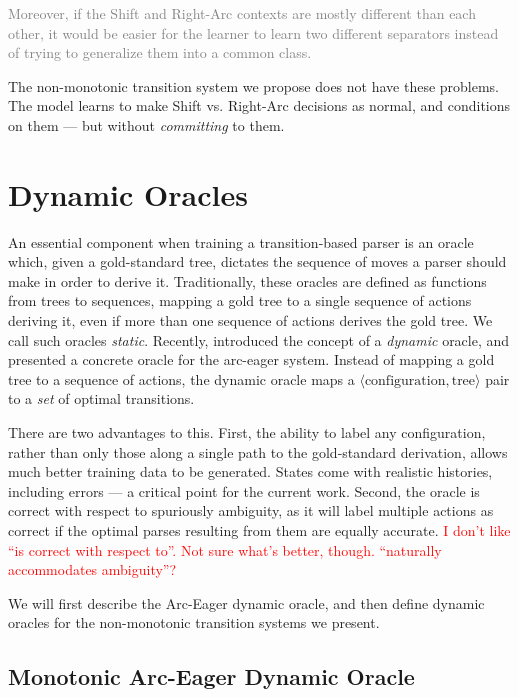 \documentclass[11pt,letterpaper]{article}
\newcommand{\tuple}[1]{$\langle#1\rangle$}
\newcommand{\maybe}[1]{\textcolor{gray}{#1}}
\newcommand{\note}[1]{\textcolor{red}{#1}}
\begin{document}
\maybe{Moreover, if the Shift and Right-Arc contexts are mostly different than each
other, it would be easier for the learner to learn two different separators
instead of trying to generalize them into a common class.}

The non-monotonic transition system we propose does not have these problems.
The model learns to make Shift vs. Right-Arc decisions as normal, and conditions on them --- but
without \emph{committing} to them.

\section{Dynamic Oracles}
\label{ref:oracle}

 An essential component when training a transition-based parser is an oracle
 which, given a gold-standard tree, dictates the sequence of moves a parser
 should make in order to derive it.  Traditionally, these oracles are defined
 as functions from trees to sequences, mapping a gold tree to a single sequence
 of actions deriving it, even if more than one sequence of actions derives the
 gold tree. We call such oracles \emph{static}.  Recently, 
 \citet{goldberg:12} introduced the concept of a \emph{dynamic} oracle, and
 presented a concrete oracle for the arc-eager system.  Instead of mapping a
 gold tree to a sequence of actions, the dynamic oracle maps a
 \tuple{\text{configuration}, \text{tree}} pair to a \emph{set} of optimal transitions.

There are two advantages to this. First, the ability to label any configuration,
rather than only those along a single path to the gold-standard derivation,
allows much better training data to be generated. States come with realistic
histories, including errors --- a critical point for the current work. Second,
the oracle is correct with respect to spuriously ambiguity, as it will label multiple actions
as correct if the optimal parses resulting from them are equally accurate.
\note{I don't like ``is correct with respect to''. Not sure what's better,
though. ``naturally accommodates ambiguity''?}

We will first describe the Arc-Eager dynamic oracle, and then define dynamic
oracles for the non-monotonic transition systems we present.

\subsection{Monotonic Arc-Eager Dynamic Oracle}
\end{document}
